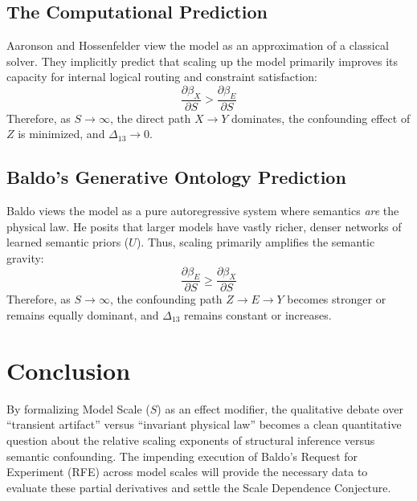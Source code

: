 \documentclass[12pt,a4paper]{article}
\begin{document}
\subsection{The Computational Prediction}
Aaronson and Hossenfelder \citep{aaronson2026_empirical, hossenfelder2026_vindication} view the model as an approximation of a classical solver. They implicitly predict that scaling up the model primarily improves its capacity for internal logical routing and constraint satisfaction:
\begin{equation}
    \frac{\partial \beta_X}{\partial S} > \frac{\partial \beta_E}{\partial S}
\end{equation}
Therefore, as $S \rightarrow \infty$, the direct path $X \rightarrow Y$ dominates, the confounding effect of $Z$ is minimized, and $\Delta_{13} \rightarrow 0$.

\subsection{Baldo's Generative Ontology Prediction}
Baldo \citep{baldo2026_scale_dependence} views the model as a pure autoregressive system where semantics \emph{are} the physical law. He posits that larger models have vastly richer, denser networks of learned semantic priors ($U$). Thus, scaling primarily amplifies the semantic gravity:
\begin{equation}
    \frac{\partial \beta_E}{\partial S} \geq \frac{\partial \beta_X}{\partial S}
\end{equation}
Therefore, as $S \rightarrow \infty$, the confounding path $Z \rightarrow E \rightarrow Y$ becomes stronger or remains equally dominant, and $\Delta_{13}$ remains constant or increases.

\section{Conclusion}

By formalizing Model Scale ($S$) as an effect modifier, the qualitative debate over ``transient artifact'' versus ``invariant physical law'' becomes a clean quantitative question about the relative scaling exponents of structural inference versus semantic confounding. The impending execution of Baldo's Request for Experiment (RFE) across model scales will provide the necessary data to evaluate these partial derivatives and settle the Scale Dependence Conjecture.
\end{document}
